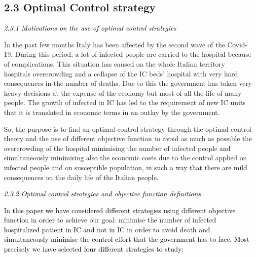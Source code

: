 \documentclass[a4paper]{article}
\begin{document}
\bigskip

\subsection[2.3 Optimal Control strategy]{2.3 Optimal Control strategy}
\hypertarget{Toc66707026}{}\textit{\textcolor{black}{2.3.1 Motivations on the use of optimal control strategies}}

\textcolor[rgb]{0.07450981,0.078431375,0.07450981}{In the past few months Italy has been affected by the second wave of
the Covid-19. During this period, a lot of infected people are carried to the hospital because of complications. This
situation has caused on the whole Italian territory hospitals overcrowding and a collapse of the IC beds’ hospital with
very hard consequences in the number of deaths. Due to this the government has taken very heavy decisions at the
expense of the economy but most of all the life of many people. The growth of infected in IC has led to the requirement
of new IC units that it is translated in economic terms in an outlay by the government. }

\textcolor[rgb]{0.07450981,0.078431375,0.07450981}{So, the purpose is to find an optimal control strategy through the
optimal control theory and the use of different objective function to avoid as much as possible the overcrowding of the
hospital minimising the number of infected people and simultaneously minimising also the economic costs due to the
control applied on infected people and on susceptible population, in such a way that there are mild consequences on the
daily life of the Italian people. \ }


\bigskip

\textit{\textcolor{black}{2.3.2 Optimal control strategies and objective function definitions}}

\textcolor{black}{In this paper we have considered different strategies using different objective function in order to
achieve our goal: minimise the number of infected hospitalized patient in IC and not in IC in order to avoid death and
simultaneously minimise the control effort that the government has to face. Most precisely we have selected four
different strategies to study:}
\end{document}
